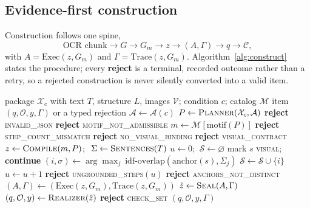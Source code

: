 \documentclass[conference]{IEEEtran}
\newcommand{\TLV}{\mathsf{TLV}}
\begin{document}
\subsection{Evidence-first construction}
Construction follows one spine,
\begin{equation}
\text{OCR chunk} \rightarrow G \rightarrow G_m \rightarrow z \rightarrow (A,\Gamma) \rightarrow q \rightarrow \mathcal{C},
\end{equation}
with $A=\mathrm{Exec}(z,G_m)$ and $\Gamma=\mathrm{Trace}(z,G_m)$. Algorithm~\ref{alg:construct}
states the procedure; every \textbf{reject} is a terminal, recorded outcome rather
than a retry, so a rejected construction is never silently converted into a valid
item.

\begin{algorithm}[t]
\caption{ECM-TQAG construction with the cross-modal contract}
\label{alg:construct}
\begin{algorithmic}[1]
\Require package $\mathcal{X}_c$ with text $T$, structure $L$, images $\mathcal{V}$; condition $c$; catalog $\mathcal{M}$
\Ensure item $(q,\mathcal{O},y,\Gamma)$ or a typed rejection
\State $\mathcal{A}\gets\mathcal{A}(c)$ 
\State $P\gets\textsc{Planner}(\mathcal{X}_c,\mathcal{A})$ 
 \State \Return \textbf{reject} \textsc{invalid\_json} \EndIf
{} \State \Return \textbf{reject} \textsc{motif\_not\_admissible} \EndIf
\State $m\gets\mathcal{M}[\mathrm{motif}(P)]$
 \State \Return \textbf{reject} \textsc{step\_count\_mismatch} \EndIf
{}
    \State \Return \textbf{reject} \textsc{no\_visual\_binding}
  \EndIf
\EndFor
\If{$c=\TLV$ and $m\notin\mathcal{M}_V$} \State \Return \textbf{reject} \textsc{visual\_contract} \EndIf
\State $z\gets\textsc{Compile}(m,P)$; $\ \Sigma\gets\textsc{Sentences}(T)$
\State $u\gets0$; $\ \mathcal{S}\gets\varnothing$
    \State mark $s$ \textsc{visual}; \textbf{continue} 
  \EndIf
  \State $(i,\sigma)\gets\arg\max_{j}\ \mathrm{idf\text{-}overlap}(\mathrm{anchor}(s),\Sigma_j)$
  \If{$\sigma\ge\tau$} \State $\mathcal{S}\gets\mathcal{S}\cup\{i\}$ \Else{} \State $u\gets u+1$ \EndIf
\EndFor
{} \State \Return \textbf{reject} \textsc{ungrounded\_steps}$(u)$ \EndIf
{} \State \Return \textbf{reject} \textsc{anchors\_not\_distinct} \EndIf
\State $(A,\Gamma)\gets(\mathrm{Exec}(z,G_m),\mathrm{Trace}(z,G_m))$
\State $\hat{z}\gets\textsc{Seal}(A,\Gamma)$ 
\State $(q,\mathcal{O},y)\gets\textsc{Realizer}(\hat{z})$ 
 \State \Return \textbf{reject} \textsc{check\_set} \EndIf
\State \Return $(q,\mathcal{O},y,\Gamma)$
\end{algorithmic}
\end{algorithm}
\end{document}
